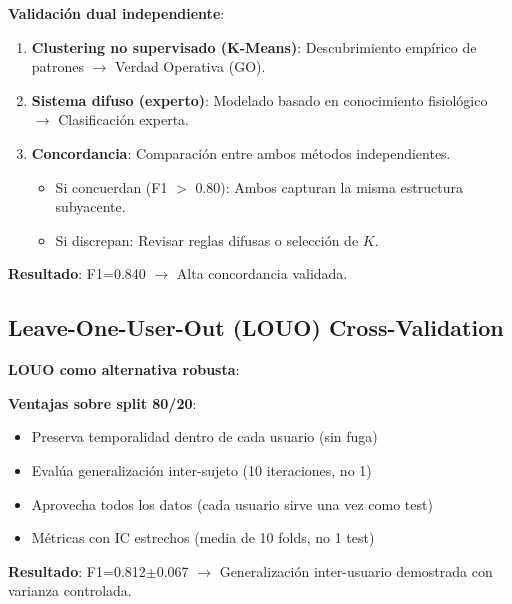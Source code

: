 \documentclass[12pt,letterpaper,twoside]{report}
\begin{document}
\begin{decisionbox}
\textbf{Validación dual independiente}:

\begin{enumerate}[noitemsep]
    \item \textbf{Clustering no supervisado (K-Means)}: Descubrimiento empírico de patrones $\to$ Verdad Operativa (GO).
    
    \item \textbf{Sistema difuso (experto)}: Modelado basado en conocimiento fisiológico $\to$ Clasificación experta.
    
    \item \textbf{Concordancia}: Comparación entre ambos métodos independientes.
    \begin{itemize}[noitemsep]
        \item Si concuerdan (F1 $>$ 0.80): Ambos capturan la misma estructura subyacente.
        \item Si discrepan: Revisar reglas difusas o selección de $K$.
    \end{itemize}
\end{enumerate}

\textbf{Resultado}: F1=0.840 $\to$ Alta concordancia validada.
\end{decisionbox}

\subsection{Leave-One-User-Out (LOUO) Cross-Validation}

\begin{estadisticobox}
\textbf{LOUO como alternativa robusta}:

\textbf{Ventajas sobre split 80/20}:
\begin{itemize}[noitemsep]
    \item Preserva temporalidad dentro de cada usuario (sin fuga)
    \item Evalúa generalización inter-sujeto (10 iteraciones, no 1)
    \item Aprovecha todos los datos (cada usuario sirve una vez como test)
    \item Métricas con IC estrechos (media de 10 folds, no 1 test)
\end{itemize}

\textbf{Resultado}: F1=0.812$\pm$0.067 $\to$ Generalización inter-usuario demostrada con varianza controlada.
\end{estadisticobox}
\end{document}
